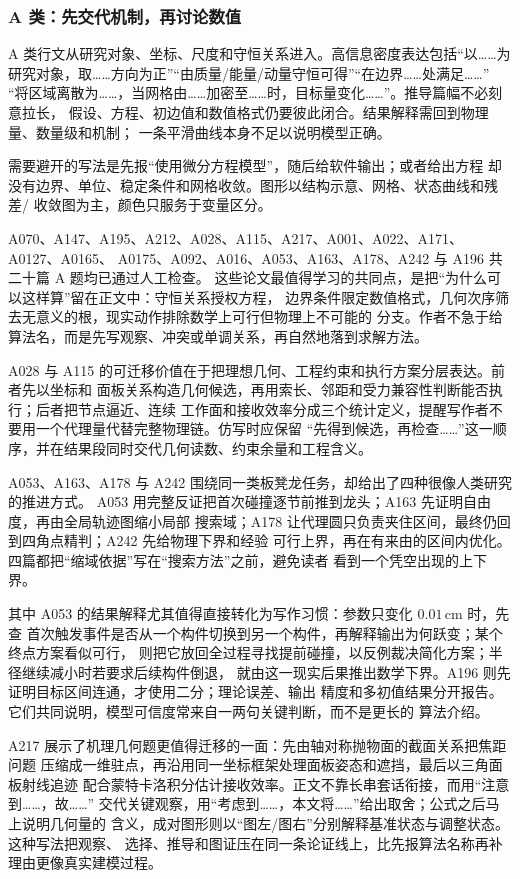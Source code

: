 \subsubsection{A 类：先交代机制，再讨论数值}

A 类行文从研究对象、坐标、尺度和守恒关系进入。高信息密度表达包括“以……为
研究对象，取……方向为正”“由质量/能量/动量守恒可得”“在边界……处满足……”
“将区域离散为……，当网格由……加密至……时，目标量变化……”。推导篇幅不必刻意拉长，
假设、方程、初边值和数值格式仍要彼此闭合。结果解释需回到物理量、数量级和机制；
一条平滑曲线本身不足以说明模型正确。

需要避开的写法是先报“使用微分方程模型”，随后给软件输出；或者给出方程
却没有边界、单位、稳定条件和网格收敛。图形以结构示意、网格、状态曲线和残差/
收敛图为主，颜色只服务于变量区分。

A070、A147、A195、A212、A028、A115、A217、A001、A022、A171、A0127、A0165、
A0175、A092、A016、A053、A163、A178、A242 与 A196 共二十篇 A 题均已通过人工检查。
这些论文最值得学习的共同点，是把“为什么可以这样算”留在正文中：守恒关系授权方程，
边界条件限定数值格式，几何次序筛去无意义的根，现实动作排除数学上可行但物理上不可能的
分支。作者不急于给算法名，而是先写观察、冲突或单调关系，再自然地落到求解方法。

A028 与 A115 的可迁移价值在于把理想几何、工程约束和执行方案分层表达。前者先以坐标和
面板关系构造几何候选，再用索长、邻距和受力兼容性判断能否执行；后者把节点逼近、连续
工作面和接收效率分成三个统计定义，提醒写作者不要用一个代理量代替完整物理链。仿写时应保留
“先得到候选，再检查……”这一顺序，并在结果段同时交代几何读数、约束余量和工程含义。

A053、A163、A178 与 A242 围绕同一类板凳龙任务，却给出了四种很像人类研究的推进方式。
A053 用完整反证把首次碰撞逐节前推到龙头；A163 先证明自由度，再由全局轨迹图缩小局部
搜索域；A178 让代理圆只负责夹住区间，最终仍回到四角点精判；A242 先给物理下界和经验
可行上界，再在有来由的区间内优化。四篇都把“缩域依据”写在“搜索方法”之前，避免读者
看到一个凭空出现的上下界。

其中 A053 的结果解释尤其值得直接转化为写作习惯：参数只变化 $0.01\,\mathrm{cm}$ 时，先查
首次触发事件是否从一个构件切换到另一个构件，再解释输出为何跃变；某个终点方案看似可行，
则把它放回全过程寻找提前碰撞，以反例裁决简化方案；半径继续减小时若要求后续构件倒退，
就由这一现实后果推出数学下界。A196 则先证明目标区间连通，才使用二分；理论误差、输出
精度和多初值结果分开报告。它们共同说明，模型可信度常来自一两句关键判断，而不是更长的
算法介绍。

A217 展示了机理几何题更值得迁移的一面：先由轴对称抛物面的截面关系把焦距问题
压缩成一维驻点，再沿用同一坐标框架处理面板姿态和遮挡，最后以三角面板射线追迹
配合蒙特卡洛积分估计接收效率。正文不靠长串套话衔接，而用“注意到……，故……”
交代关键观察，用“考虑到……，本文将……”给出取舍；公式之后马上说明几何量的
含义，成对图形则以“图左/图右”分别解释基准状态与调整状态。这种写法把观察、
选择、推导和图证压在同一条论证线上，比先报算法名称再补理由更像真实建模过程。

